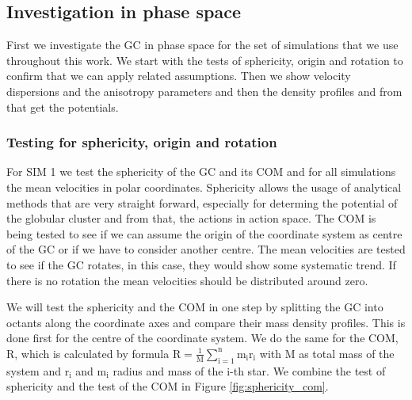 \subsection{Investigation in phase space}\label{sec:phase_space}
First we investigate the \ac{GC} in phase space for the set of simulations that we use throughout this work. We start with the tests of sphericity, origin and rotation to confirm that we can apply related assumptions. Then we show velocity dispersions and the anisotropy parameters and then the density profiles and from that get the potentials. 

\subsubsection{Testing for sphericity, origin and rotation}
\par For SIM 1 we test the sphericity of the \ac{GC} and its \ac{COM} and for all simulations the mean velocities in polar coordinates. Sphericity allows the usage of analytical methods that are very straight forward, especially for determing the potential of the globular cluster and from that, the actions in action space. The \ac{COM} is being tested to see if we can assume the origin of the coordinate system as centre of the \ac{GC} or if we have to consider another centre. The mean velocities are tested to see if the \ac{GC} rotates, in this case, they would show some systematic trend. If there is no rotation the mean velocities should be distributed around zero.
\par We will test the sphericity and the \ac{COM} in one step by splitting the \ac{GC} into octants along the coordinate axes and compare their mass density profiles. This is done first for the centre of the coordinate system. We do the same for the \ac{COM}, R, which is calculated by formula $\mathrm{R=\frac{1}{M}\sum_{i=1}^n{m_i r_i}}$ with M as total mass of the system and  $\mathrm{r_i}$ and $\mathrm{m_i}$ radius and mass of the i-th star. We combine the test of sphericity and the test of the \ac{COM} in Figure \ref{fig:sphericity_com}. 
